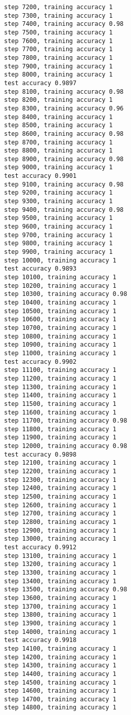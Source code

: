 \documentclass[11pt]{article}
\begin{document}
\begin{Verbatim}[commandchars=\\\{\}]
step 7200, training accuracy 1
step 7300, training accuracy 1
step 7400, training accuracy 0.98
step 7500, training accuracy 1
step 7600, training accuracy 1
step 7700, training accuracy 1
step 7800, training accuracy 1
step 7900, training accuracy 1
step 8000, training accuracy 1
test accuracy 0.9897
step 8100, training accuracy 0.98
step 8200, training accuracy 1
step 8300, training accuracy 0.96
step 8400, training accuracy 1
step 8500, training accuracy 1
step 8600, training accuracy 0.98
step 8700, training accuracy 1
step 8800, training accuracy 1
step 8900, training accuracy 0.98
step 9000, training accuracy 1
test accuracy 0.9901
step 9100, training accuracy 0.98
step 9200, training accuracy 1
step 9300, training accuracy 1
step 9400, training accuracy 0.98
step 9500, training accuracy 1
step 9600, training accuracy 1
step 9700, training accuracy 1
step 9800, training accuracy 1
step 9900, training accuracy 1
step 10000, training accuracy 1
test accuracy 0.9893
step 10100, training accuracy 1
step 10200, training accuracy 1
step 10300, training accuracy 0.98
step 10400, training accuracy 1
step 10500, training accuracy 1
step 10600, training accuracy 1
step 10700, training accuracy 1
step 10800, training accuracy 1
step 10900, training accuracy 1
step 11000, training accuracy 1
test accuracy 0.9902
step 11100, training accuracy 1
step 11200, training accuracy 1
step 11300, training accuracy 1
step 11400, training accuracy 1
step 11500, training accuracy 1
step 11600, training accuracy 1
step 11700, training accuracy 0.98
step 11800, training accuracy 1
step 11900, training accuracy 1
step 12000, training accuracy 0.98
test accuracy 0.9898
step 12100, training accuracy 1
step 12200, training accuracy 1
step 12300, training accuracy 1
step 12400, training accuracy 1
step 12500, training accuracy 1
step 12600, training accuracy 1
step 12700, training accuracy 1
step 12800, training accuracy 1
step 12900, training accuracy 1
step 13000, training accuracy 1
test accuracy 0.9912
step 13100, training accuracy 1
step 13200, training accuracy 1
step 13300, training accuracy 1
step 13400, training accuracy 1
step 13500, training accuracy 0.98
step 13600, training accuracy 1
step 13700, training accuracy 1
step 13800, training accuracy 1
step 13900, training accuracy 1
step 14000, training accuracy 1
test accuracy 0.9918
step 14100, training accuracy 1
step 14200, training accuracy 1
step 14300, training accuracy 1
step 14400, training accuracy 1
step 14500, training accuracy 1
step 14600, training accuracy 1
step 14700, training accuracy 1
step 14800, training accuracy 1

\end{Verbatim}
\end{document}
